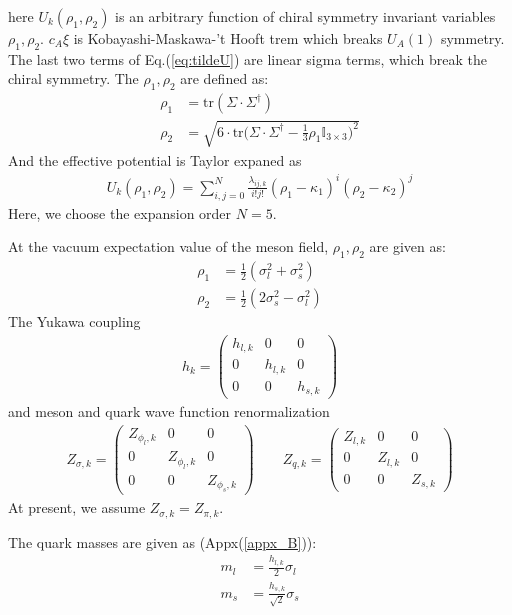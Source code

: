 \documentclass[12pt]{article}
\begin{document}
here $U_k(\rho_1,\rho_2)$ is an arbitrary function of chiral symmetry invariant variables $\rho_1,\rho_2$.  $ c_A \xi$ is Kobayashi-Maskawa-’t Hooft trem which breaks $U_A(1)$ symmetry. The last two terms of Eq.(\ref{eq:tildeU}) are linear sigma terms, which break the chiral symmetry. The $\rho_1,\rho_2$ are defined as:
\begin{align}
\rho_1&=\text{tr}(\Sigma \cdot \Sigma ^\dagger) \\
\rho_2&=\sqrt{6 \cdot \text{tr}\bigg (\Sigma \cdot \Sigma ^\dagger-\frac{1}{3} \rho_1 \mathbb{I}_{3 \times 3} \bigg )^2 }
\end{align}
And the effective potential is Taylor expaned as
\begin{align}
U_{k} (\rho_1,\rho_2)=\sum_{i,j=0}^N \frac{\lambda_{ij,k}}{i!j!}(\rho_1 -\kappa_1)^i(\rho_2-\kappa_2)^j
\end{align}
Here, we choose the expansion order $N=5$.

At the vacuum expectation value of the meson field, $\rho_1,\rho_2$ are given as:
\begin{align}
\rho_1&=\frac{1}{2}(\sigma_l^2+\sigma_s^2)\\
\rho_2&=\frac{1}{2}(2 \sigma_s^2-\sigma_l^2)
\end{align}
The Yukawa coupling 
\begin{align}
h_k=\begin{pmatrix} 
h_{l,k}&0&0\\
0&h_{l,k}&0\\
0&0&h_{s,k}
\end{pmatrix}
\end{align}
and meson and quark wave function renormalization
\begin{align}
Z_{\sigma,k}=\begin{pmatrix} 
Z_{\phi_l,k}&0&0\\
0&Z_{\phi_l,k}&0\\
0&0&Z_{\phi_s,k}
\end{pmatrix} 
\quad \quad
Z_{q,k}=\begin{pmatrix} 
Z_{l,k}&0&0\\
0&Z_{l,k}&0\\
0&0&Z_{s,k}
\end{pmatrix} 
\end{align}
At present, we assume $Z_{\sigma,k}=Z_{\pi,k}$.

The quark masses are given as (Appx(\ref{appx_B})):
 \begin{align}\label{quarkmass_eq}
m_l&=\frac{h_{l,k}}{2}\sigma_l \\
m_s&=\frac{h_{s,k}}{\sqrt{2}}\sigma_s
\end{align}
\end{document}
